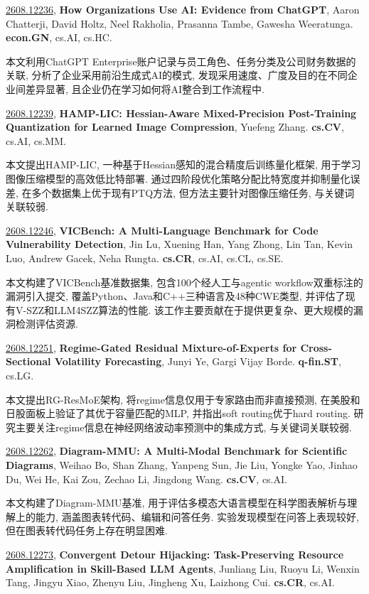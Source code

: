 \documentclass[9pt, a4paper]{article}
\theoremstyle{plain}
\theoremstyle{definition}
\theoremstyle{remark}
\newcommand{\arxivwithtarget}[3]{\hypertarget{#1}{}\href{https://arxiv.org/abs/#1}{#1}, \textbf{\textcolor{arxivblue}{#2}}, #3. }
\begin{document}
\arxivwithtarget{2608.12236}{How Organizations Use AI: Evidence from ChatGPT}{Aaron Chatterji, David Holtz, Neel Rakholia, Prasanna Tambe, Gawesha Weeratunga}\textbf{econ.GN}, cs.AI, cs.HC.

本文利用ChatGPT Enterprise账户记录与员工角色、任务分类及公司财务数据的关联, 分析了企业采用前沿生成式AI的模式, 发现采用速度、广度及目的在不同企业间差异显著, 且企业仍在学习如何将AI整合到工作流程中.


\arxivwithtarget{2608.12239}{HAMP-LIC: Hessian-Aware Mixed-Precision Post-Training Quantization for Learned Image Compression}{Yuefeng Zhang}\textbf{cs.CV}, cs.AI, cs.MM.

本文提出HAMP-LIC, 一种基于Hessian感知的混合精度后训练量化框架, 用于学习图像压缩模型的高效低比特部署. 通过四阶段优化策略分配比特宽度并抑制量化误差, 在多个数据集上优于现有PTQ方法, 但方法主要针对图像压缩任务, 与关键词关联较弱.


\arxivwithtarget{2608.12246}{VICBench: A Multi-Language Benchmark for Code Vulnerability Detection}{Jin Lu, Xuening Han, Yang Zhong, Lin Tan, Kevin Luo, Andrew Gacek, Neha Rungta}\textbf{cs.CR}, cs.AI, cs.CL, cs.SE.

本文构建了VICBench基准数据集, 包含100个经人工与agentic workflow双重标注的漏洞引入提交, 覆盖Python、Java和C++三种语言及48种CWE类型, 并评估了现有V-SZZ和LLM4SZZ算法的性能. 该工作主要贡献在于提供更复杂、更大规模的漏洞检测评估资源.


\arxivwithtarget{2608.12251}{Regime-Gated Residual Mixture-of-Experts for Cross-Sectional Volatility Forecasting}{Junyi Ye, Gargi Vijay Borde}\textbf{q-fin.ST}, cs.LG.

本文提出RG-ResMoE架构, 将regime信息仅用于专家路由而非直接预测, 在美股和日股面板上验证了其优于容量匹配的MLP, 并指出soft routing优于hard routing. 研究主要关注regime信息在神经网络波动率预测中的集成方式, 与关键词关联较弱.


\arxivwithtarget{2608.12262}{Diagram-MMU: A Multi-Modal Benchmark for Scientific Diagrams}{Weihao Bo, Shan Zhang, Yanpeng Sun, Jie Liu, Yongke Yao, Jinhao Du, Wei He, Kai Zou, Zechao Li, Jingdong Wang}\textbf{cs.CV}, cs.AI.

本文构建了Diagram-MMU基准, 用于评估多模态大语言模型在科学图表解析与理解上的能力, 涵盖图表转代码、编辑和问答任务. 实验发现模型在问答上表现较好, 但在图表转代码任务上存在明显困难.


\arxivwithtarget{2608.12273}{Convergent Detour Hijacking: Task-Preserving Resource Amplification in Skill-Based LLM Agents}{Junliang Liu, Ruoyu Li, Wenxin Tang, Jingyu Xiao, Zhenyu Liu, Jingheng Xu, Laizhong Cui}\textbf{cs.CR}, cs.AI.
\end{document}
